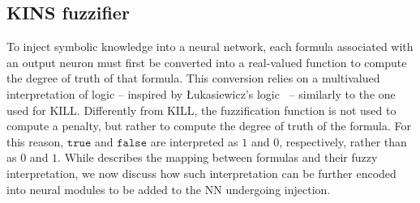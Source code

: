 \subsection{KINS fuzzifier}\label{subsec:kins-fuzzifier}
%

%
To inject symbolic knowledge into a neural network, each formula associated with an output neuron must first be converted into a real-valued function to compute the degree of truth of that formula.
%
This conversion relies on a multivalued interpretation of logic -- inspired by \L{}ukasiewicz's logic~\cite{DBLP:journals/jsyml/Hay63} -- similarly to the one used for \gls{KILL}.
%
Differently from \gls{KILL}, the fuzzification function is not used to compute a penalty, but rather to compute the degree of truth of the formula.
%
For this reason, $\mathtt{true}$ and $\mathtt{false}$ are interpreted as $1$ and $0$, respectively, rather than as $0$ and $1$.
%
While  describes the mapping between formulas and their fuzzy interpretation, we now discuss how such interpretation can be further encoded into neural modules to be added to the \gls{NN} undergoing injection.



